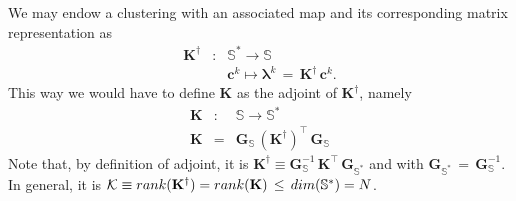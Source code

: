 \documentclass[twocolumn,aps,sort,nofootinbib]{revtex4}
\begin{document}
\begin{appendix}
We may endow a clustering with an associated map and its corresponding
matrix representation as
\begin{eqnarray}
\mathbf{K}^\dagger & : & \mathbb{S^*} \longrightarrow \mathbb{S} \\
                   &   & \mathbf{c}^k \mapsto \mathbf{\lambda}^k\,=\,\mathbf{K}^\dagger\,\mathbf{c}^k .\nonumber
\end{eqnarray}
This way we would have to define $\mathbf{K}$ as the adjoint of $\mathbf{K}^\dagger$, namely
\begin{eqnarray}
\mathbf{K}  & : & \mathbb{S} \longrightarrow \mathbb{S^*} \\
\mathbf{K}  & = & \mathbf{G}_{\mathbb{S}}\,\left(\mathbf{K}^\dagger\right)^\intercal \,\mathbf{G}_{\mathbb{S}} \nonumber
\end{eqnarray}
Note that, by definition of adjoint, it is 
$\mathbf{K}^\dagger\equiv \mathbf{G}_{\mathbb{S}}^{-1}\, \mathbf{K}^\intercal \,\mathbf{G}_{\mathbb{S^*}}$
and with $\mathbf{G}_{\mathbb{S^*}}\,=\,\mathbf{G}_{\mathbb{S}}^{-1}$.
In general, it is ${\cal K}\equiv rank(\mathbf{K}^\dagger)=rank(\mathbf{K})\,\leq\,dim(\mathbb{S^*})=N$.



\end{appendix}
\end{document}
